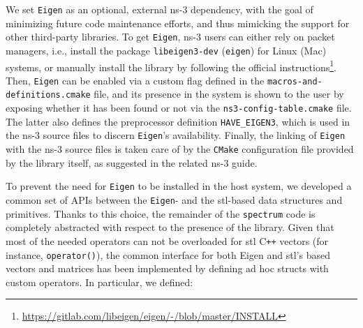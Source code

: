 We set \texttt{Eigen} as an optional, external ns-3 dependency, with the goal of minimizing future code maintenance efforts, %
and thus mimicking the support for other third-party libraries. To get \texttt{Eigen}, ns-3 users can either rely on packet managers, i.e., install the package \texttt{libeigen3-dev} (\texttt{eigen}) for Linux (Mac) systems, or manually install the library by following the official instructions\footnote{\url{https://gitlab.com/libeigen/eigen/-/blob/master/INSTALL}}. Then, \texttt{Eigen} can be enabled via a custom flag defined in the \texttt{macros-\-and-\-definitions.cmake} file, and its presence in the system is shown to the user by exposing whether it has been found or not via the \texttt{ns3-\-config-\-table.cmake} file. The latter also defines the preprocessor definition \texttt{HAVE\_EIGEN3}, which is used in the ns-3 source files to discern \texttt{Eigen}'s availability. Finally, the linking of \texttt{Eigen} with the ns-3 source files is taken care of by the \texttt{CMake} configuration file provided by the library itself, as suggested in the related ns-3 guide.

To prevent the need for \texttt{Eigen} to be installed in the host system, we developed a common set of APIs between the \texttt{Eigen}- and the \gls{stl}-based data structures and primitives. Thanks to this choice, the remainder of the \texttt{spectrum} code is completely abstracted with respect to the presence of the library.
Given that most of the needed operators can not be overloaded for \gls{stl} C\texttt{++} vectors (for instance, \texttt{operator()}), the common interface for both Eigen and \gls{stl}’s based vectors and matrices has been implemented by defining ad hoc structs with custom operators. In particular, we defined:

